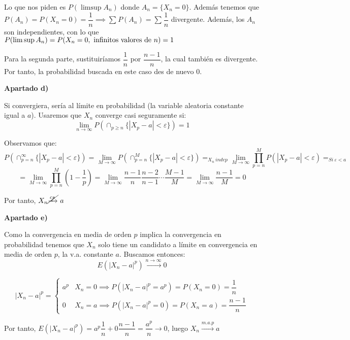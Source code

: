 \documentclass[openany]{book}
\begin{document}
\begin{exercise}
Lo que nos piden es $ P(\limsup A_n) $ donde $ A_n = \{X_n = 0\} $. Además tenemos que $ P(A_n) = P(X_n  =0) = \dfrac{1}{n} \implies \sum\limits_{}^{}P(A_n) = \sum\limits_{}^{}\dfrac{1}{n} $ divergente. Además, los $ A_n $ son independientes, con lo que $ P(\limsup A_n) = P(X_n = 0,\ \text{infinitos valores de $ n $}) = 1 $

Para la segunda parte, sustituiríamos $ \dfrac{1}{n}  $ por $ \dfrac{n-1}{n} $, la cual también es divergente. Por tanto, la probabilidad buscada en este caso des de nuevo 0.

\begin{flushright}
    \textbf{Apartado d)}
\end{flushright}

Si convergiera, sería al límite en probabilidad (la variable aleatoria constante igual a $ a $). Usaremos que $ X_n $ converge casi seguramente si:
$$ \lim_{n \to \infty} P (\cap_{p\geq n} \{|X_{p}-a|<\varepsilon\}) = 1 $$

Observamos que:
$$ P(\cap_{p=n}^{\infty}\{|X_{p}-a|<\varepsilon\}) = \lim_{M \to \infty} P(\cap_{p=n}^{M}\{|X_{p}-a|<\varepsilon\}) =_{X_n\ indep} \lim_{M \to \infty} \prod_{p=n}^{M}P(|X_{p}-a|<\varepsilon) =_{Si\ \varepsilon<a}   $$
$$ = \lim_{M \to \infty} \prod_{p=n}^{M}\left(1-\dfrac{1}{p}\right) = \lim_{M \to \infty}\dfrac{n-1}{n} \dfrac{n-2}{n-1} \cdots \dfrac{M-1}{M} = \lim_{M \to \infty} \dfrac{n-1}{M} = 0  $$

Por tanto, $ X_n \cancel{\xrightarrow{cs}}\ a $

\begin{flushright}
    \textbf{Apartado e)}
\end{flushright}


Como la convergencia en media de orden $ p $ implica la convergencia en probabilidad tenemos que $ X_n $ solo tiene un candidato a límite en convergencia en media de orden $ p $, la v.a. constante $ a $. Buscamos entonces:
$$ E(|X_n-a|^{p}) \xrightarrow{n \to \infty} 0 $$


$$ |X_n-a|^{p} = \left\{
\begin{array}{ll}
    a^{p} & X_n = 0 \implies P(|X_n-a|^{p} = a^{p}) = P(X_n = 0) = \dfrac{1}{n}\\ 
    0 & X_n = a \implies P(|X_n-a|^{p}=0) = P(X_n = a) = \dfrac{n-1}{n}
\end{array}
\right. $$

Por tanto, $ E(|X_n-a|^{p}) = a^{p}\dfrac{1}{n} + 0 \dfrac{n-1}{n} = \dfrac{a^{p}}{n} \to 0 $, luego $ X_n \xrightarrow{m.a.p} a $



\end{exercise}
\end{document}
